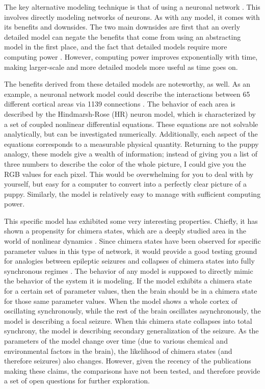 The key alternative modeling technique is that of using a neuronal network \autocite{Lytton2008}.
This involves directly modeling networks of neurons.
As with any model, it comes with its benefits and downsides.
The two main downsides are first that an overly detailed model can negate the benefits that come from using an abstracting model in the first place, and the fact that detailed models require more computing power \autocite{Lytton2008}.
However, computing power improves exponentially with time, making larger-scale and more detailed models more useful as time goes on.

The benefits derived from these detailed models are noteworthy, as well.
As an example, a neuronal network model could describe the interactions between 65 different cortical areas via 1139 connections \autocite{Santos2017}.
The behavior of each area is described by the Hindmarsh-Rose (HR) neuron model, which is characterized by a set of coupled nonlinear differential equations.
These equations are not solvable analytically, but can be investigated numerically.
Additionally, each aspect of the equations corresponds to a measurable physical quantity.
Returning to the puppy analogy, these models give a wealth of information; instead of giving you a list of three numbers to describe the color of the whole picture, I could give you the RGB values for each pixel.
This would be overwhelming for you to deal with by yourself, but easy for a computer to convert into a perfectly clear picture of a puppy.
Similarly, the model is relatively easy to manage with sufficient computing power.

This specific model has exhibited some very interesting properties.
Chiefly, it has shown a propensity for chimera states, which are a deeply studied area in the world of nonlinear dynamics \autocite{Santos2017,Martens2013}.
Since chimera states have been observed for specific parameter values in this type of network, it would provide a good testing ground for analogies between epileptic seizures and collapses of chimera states into fully synchronous regimes \autocite{Andrzejak2016}.
The behavior of any model is supposed to directly mimic the behavior of the system it is modeling.
If the model exhibits a chimera state for a certain set of parameter values, then the brain should be in a chimera state for those same parameter values.
When the model shows a whole cortex of oscillating synchronously, while the rest of the brain oscillates asynchronously, the model is describing a focal seizure.
When this chimera state collapses into total synchrony, the model is describing secondary generalization of the seizure.
As the parameters of the model change over time (due to various chemical and environmental factors in the brain), the likelihood of chimera states (and therefore seizures) also changes.
However, given the recency of the publications making these claims, the comparisons have not been tested, and therefore provide a set of open questions for further exploration.

